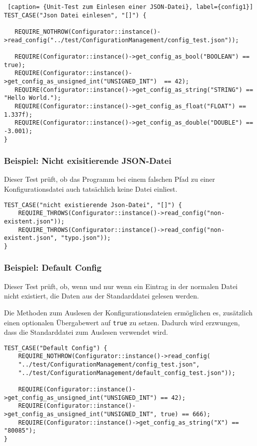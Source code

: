 \documentclass[../review_3.tex]{subfiles}
\begin{document}
\begin{lstlisting} [caption= {Unit-Test zum Einlesen einer JSON-Datei}, label={config1}]
TEST_CASE("Json Datei einlesen", "[]") {
    
   REQUIRE_NOTHROW(Configurator::instance()->read_config("../test/ConfigurationManagement/config_test.json"));
    
   REQUIRE(Configurator::instance()->get_config_as_bool("BOOLEAN") == true);
   REQUIRE(Configurator::instance()->get_config_as_unsigned_int("UNSIGNED_INT")  == 42);
   REQUIRE(Configurator::instance()->get_config_as_string("STRING") == "Hello World.");
   REQUIRE(Configurator::instance()->get_config_as_float("FLOAT") == 1.337f);
   REQUIRE(Configurator::instance()->get_config_as_double("DOUBLE") == -3.001);
} \end{lstlisting}

\subsubsection{Beispiel: Nicht exisitierende JSON-Datei}

Dieser Test prüft, ob das Programm bei einem falschen Pfad zu einer Konfigurationsdatei auch tatsächlich keine Datei einliest.

\begin{lstlisting}[caption= {Unit Test: Nicht existierende JSON-Datei}, label={config2}]
TEST_CASE("nicht existierende Json-Datei", "[]") {
    REQUIRE_THROWS(Configurator::instance()->read_config("non-existent.json"));
    REQUIRE_THROWS(Configurator::instance()->read_config("non-existent.json", "typo.json"));
}\end{lstlisting}

\subsubsection{Beispiel: Default Config}

Dieser Test prüft, ob, wenn und nur wenn ein Eintrag in der normalen Datei nicht existiert, die Daten aus der Standarddatei gelesen werden.

Die Methoden zum Auslesen der Konfigurationsdateien ermöglichen es, zusätzlich einen optionalen Übergabewert auf \texttt{true} zu setzen. Dadurch wird erzwungen, dass die Standarddatei zum Auslesen verwendet wird.

\begin{lstlisting}[caption= {Unit Test: Default Config}, label={config4}]
TEST_CASE("Default Config") {
    REQUIRE_NOTHROW(Configurator::instance()->read_config(
    "../test/ConfigurationManagement/config_test.json",
    "../test/ConfigurationManagement/default_config_test.json"));
    
    REQUIRE(Configurator::instance()->get_config_as_unsigned_int("UNSIGNED_INT") == 42);
    REQUIRE(Configurator::instance()->get_config_as_unsigned_int("UNSIGNED_INT", true) == 666);
    REQUIRE(Configurator::instance()->get_config_as_string("X") == "80085");
}\end{lstlisting}
\end{document}
